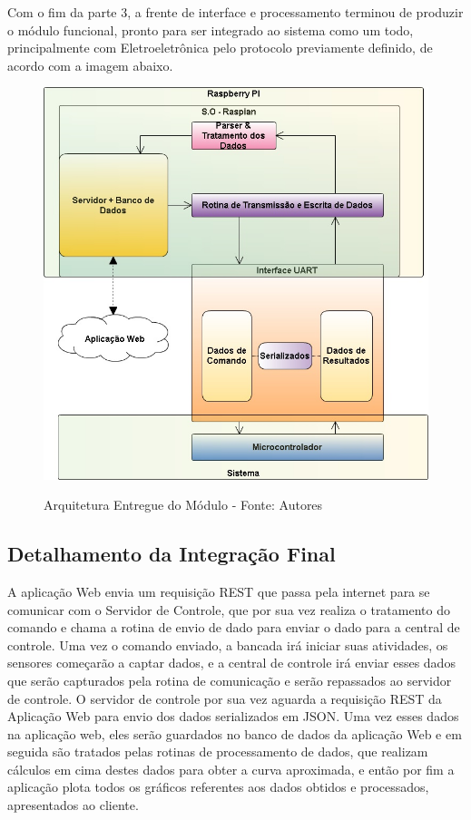 Com o fim da parte 3, a frente de interface e processamento terminou de produzir o módulo funcional, pronto para ser integrado ao sistema como um todo, principalmente com Eletroeletrônica pelo protocolo previamente definido, de acordo com a imagem abaixo.

\begin{figure}[H]
  \centering
  \includegraphics[keepaspectratio=true,scale=0.7]{figuras/nova_arquitetura.png}
  \label{fig:nova_arquitetura}
  \caption{Arquitetura Entregue do Módulo - Fonte: Autores}
\end{figure}


\subsection{Detalhamento da Integração Final}

A aplicação Web envia um requisição REST que passa pela internet para se comunicar com o Servidor de Controle,
que por sua vez realiza o tratamento do comando e chama a rotina de envio de dado para enviar o dado para a
central de controle. Uma vez o comando enviado, a bancada irá iniciar suas atividades, os sensores começarão
a captar dados, e a central de controle irá enviar esses dados que serão capturados pela rotina de comunicação 
e serão repassados ao servidor de controle. O servidor de controle por sua vez aguarda a requisição REST da 
Aplicação Web para envio dos dados serializados em JSON. Uma vez esses dados na aplicação web, eles serão
guardados no banco de dados da aplicação Web e em seguida são tratados pelas rotinas de processamento de dados,
que realizam cálculos em cima destes dados para obter a curva aproximada, e então por fim a aplicação plota
todos os gráficos referentes aos dados obtidos e processados, apresentados ao cliente.

